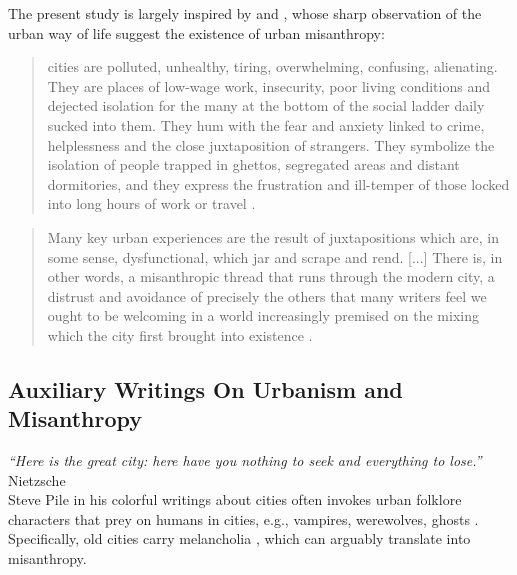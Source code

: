 \documentclass[11pt, letterpaper]{article}
\begin{document}
\begin{spacing}{1.4}
The present study is largely 
inspired by \citet{amin06} and \citet{thrift05}, whose sharp observation of
the urban way of life suggest the existence of urban misanthropy: 

\begin{quote}
  cities are polluted,
  unhealthy, tiring, overwhelming, confusing, alienating. They are places of
  low-wage work, insecurity, poor living conditions and dejected isolation for
  the many at the bottom of the social ladder daily sucked into them. They hum
  with the fear and anxiety linked to crime, helplessness and the close
  juxtaposition of strangers. They symbolize the isolation of people trapped in
  ghettos, segregated areas and distant dormitories, and they express the
  frustration and ill-temper of those locked into long hours of work or travel \citep[][p. 1011]{amin06}.
\end{quote}
\begin{quote}
 Many key urban experiences are the result of
juxtapositions which are, in some sense, dysfunctional, which jar and scrape and
rend. [...]  %
There is, in other words, a {misanthropic} thread that runs through
the modern city, a distrust and avoidance of precisely the others that many writers feel we ought to be
welcoming in a world increasingly premised on the mixing which the city first
brought into existence \citep[][p. 140]{thrift05}.
\end{quote}




\subsection{Auxiliary Writings On Urbanism and Misanthropy}

{\small\it \noindent ``Here is the great city: here have you nothing to seek and
  everything to lose.''} Nietzsche\\


Steve Pile in his colorful writings about cities often invokes
urban folklore characters that prey on humans in cities, e.g., vampires, werewolves, ghosts  \citep{pile05,pile05B,pile99}.
%
Specifically, old cities carry melancholia \citep{pile05B}, which can arguably translate into misanthropy.
%


\end{spacing}
\end{document}
